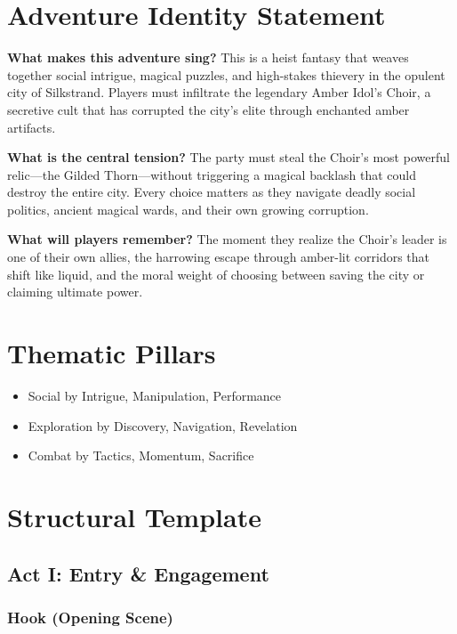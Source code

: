\documentclass[11pt]{article}
\begin{document}




\section*{Adventure Identity Statement}

\textbf{What makes this adventure sing?} This is a heist fantasy that weaves together social intrigue, magical puzzles, and high-stakes thievery in the opulent city of Silkstrand. Players must infiltrate the legendary Amber Idol's Choir, a secretive cult that has corrupted the city's elite through enchanted amber artifacts.

\textbf{What is the central tension?} The party must steal the Choir's most powerful relic---the Gilded Thorn---without triggering a magical backlash that could destroy the entire city. Every choice matters as they navigate deadly social politics, ancient magical wards, and their own growing corruption.

\textbf{What will players remember?} The moment they realize the Choir's leader is one of their own allies, the harrowing escape through amber-lit corridors that shift like liquid, and the moral weight of choosing between saving the city or claiming ultimate power.

\section*{Thematic Pillars}

\begin{itemize}
  \item Social by Intrigue, Manipulation, Performance
  \item Exploration by Discovery, Navigation, Revelation
  \item Combat by Tactics, Momentum, Sacrifice
\end{itemize}

\section*{Structural Template}

\subsection*{Act I: Entry \& Engagement}

\subsubsection*{Hook (Opening Scene)}
\end{document}
